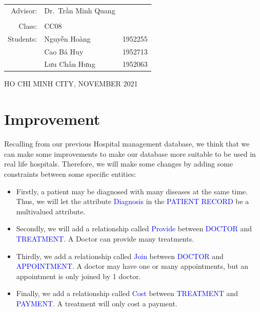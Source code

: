 \documentclass[a4paper]{article}
\numberwithin{equation}{section}
\begin{document}
\begin{titlepage}
  \begin{table}[h]
    \begin{tabular}{rll}
      \hspace{5cm} Advisor:  & Dr.\ Trần Minh Quang           \\
                             &                                \\
      \hspace{5cm} Class:    & CC08                           \\
      \hspace{5cm} Students: & Nguyễn Hoàng         & 1952255 \\
                             & Cao Bá Huy           & 1952713 \\
                             & Lưu Chấn Hưng        & 1952063 \\
    \end{tabular}
  \end{table}

  \begin{center}
    {\footnotesize \large HO CHI MINH CITY, NOVEMBER 2021}
  \end{center}
\end{titlepage}


\newpage
\tableofcontents
\newpage

\section{Improvement}
Recalling from our previous Hospital management database, we think that we can make some improvements to make our database more suitable to be used in real life hospitals.
Therefore, we will make some changes by adding some constraints between some specific entities:

\begin{itemize}
  \item Firstly, a patient may be diagnosed with many diseases at the same time.
        Thus, we will let the attribute \textcolor{blue}{Diagnosis} in the \textcolor{blue}{PATIENT RECORD} be a multivalued attribute.
  \item Secondly, we will add a relationship called \textcolor{blue}{Provide} between \textcolor{blue}{DOCTOR} and \textcolor{blue}{TREATMENT}\@.
        A Doctor can provide many treatments.

  \item Thirdly, we add a relationship called \textcolor{blue}{Join} between \textcolor{blue}{DOCTOR} and \textcolor{blue}{APPOINTMENT}\@.
        A doctor may have one or many appointments, but an appointment is only joined by 1 doctor.
  \item Finally,  we add a relationship called \textcolor{blue}{Cost} between \textcolor{blue}{TREATMENT} and \textcolor{blue}{PAYMENT}\@.
        A treatment will only cost a payment.

\end{itemize}
\end{document}
